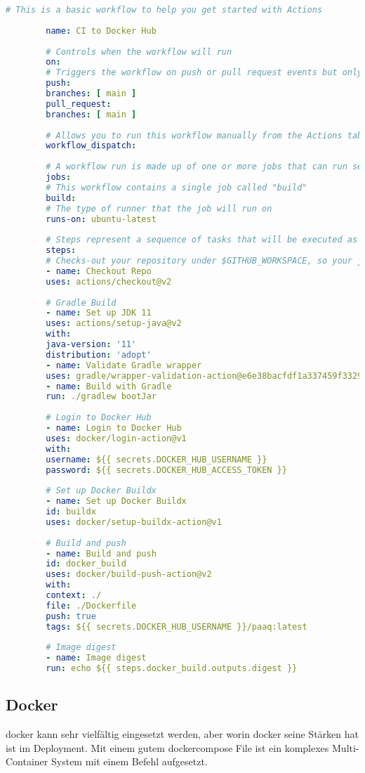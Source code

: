 \documentclass[../main.tex]{subfiles}
\begin{document}
	\begin{lstlisting}[language=yaml]
		# This is a basic workflow to help you get started with Actions
		
		name: CI to Docker Hub
		
		# Controls when the workflow will run
		on:
		# Triggers the workflow on push or pull request events but only for the main branch
		push:
		branches: [ main ]
		pull_request:
		branches: [ main ]
		
		# Allows you to run this workflow manually from the Actions tab
		workflow_dispatch:
		
		# A workflow run is made up of one or more jobs that can run sequentially or in parallel
		jobs:
		# This workflow contains a single job called "build"
		build:
		# The type of runner that the job will run on
		runs-on: ubuntu-latest
		
		# Steps represent a sequence of tasks that will be executed as part of the job
		steps:
		# Checks-out your repository under $GITHUB_WORKSPACE, so your job can access it
		- name: Checkout Repo
		uses: actions/checkout@v2
		
		# Gradle Build
		- name: Set up JDK 11
		uses: actions/setup-java@v2
		with:
		java-version: '11'
		distribution: 'adopt'
		- name: Validate Gradle wrapper
		uses: gradle/wrapper-validation-action@e6e38bacfdf1a337459f332974bb2327a31aaf4b
		- name: Build with Gradle
		run: ./gradlew bootJar
		
		# Login to Docker Hub
		- name: Login to Docker Hub
		uses: docker/login-action@v1
		with:
		username: ${{ secrets.DOCKER_HUB_USERNAME }}
		password: ${{ secrets.DOCKER_HUB_ACCESS_TOKEN }}
		
		# Set up Docker Buildx
		- name: Set up Docker Buildx
		id: buildx
		uses: docker/setup-buildx-action@v1
		
		# Build and push
		- name: Build and push
		id: docker_build
		uses: docker/build-push-action@v2
		with:
		context: ./
		file: ./Dockerfile
		push: true
		tags: ${{ secrets.DOCKER_HUB_USERNAME }}/paaq:latest
		
		# Image digest
		- name: Image digest
		run: echo ${{ steps.docker_build.outputs.digest }}
	\end{lstlisting}
	
	\subsection{Docker}
	\gls{docker} kann sehr vielfältig eingesetzt werden, aber worin \gls{docker} seine Stärken hat ist im Deployment. Mit einem gutem \gls{dockercompose} File ist ein komplexes Multi-Container System mit einem Befehl aufgesetzt.
	
\end{document}

